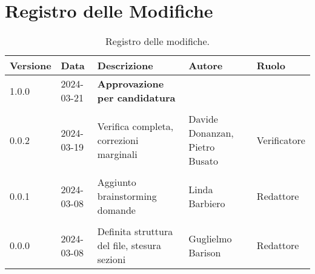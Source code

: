 \section*{Registro delle Modifiche}
\begin{table}[ht!]	
		\centering
		\begin{tabular}{ p{1.2cm} p{2cm} p{6cm} p{3cm} p{2cm}}
			\toprule
			\textbf{Versione}& \textbf{Data} & \textbf{Descrizione} & \textbf{Autore} & \textbf{Ruolo} \\
			\midrule
			1.0.0 & 2024-03-21 &\textbf{Approvazione per candidatura} & & \\\\
			0.0.2 & 2024-03-19 & Verifica completa, correzioni marginali & Davide Donanzan, Pietro Busato & Verificatore \\\\
			0.0.1 & 2024-03-08 & Aggiunto brainstorming domande & Linda Barbiero &
			Redattore \\\\ %
			0.0.0 & 2024-03-08 & Definita struttura del file, stesura sezioni & Guglielmo Barison & Redattore \\
			\bottomrule
		\end{tabular}
		\caption{Registro delle modifiche.}
		\label{table:Registro delle modifiche}
\end{table}
